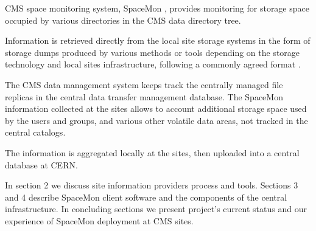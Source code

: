 CMS space monitoring system, SpaceMon \cite{spacemon}, provides monitoring for storage space 
occupied by various directories in the CMS data directory tree. 

Information is retrieved directly from the local site storage systems in the form of 
storage dumps produced by various methods or tools depending on the storage technology and
local sites infrastructure, following a commonly agreed format \cite{storagedumps}.

The CMS data management system \cite{cmsdatamanagement} keeps track the centrally managed 
file replicas in the central data transfer management database. The SpaceMon information 
collected at the sites allows to account additional storage space used by the users 
and groups, and various other volatile data areas, not tracked in the central catalogs.

The information is aggregated locally at the sites, then uploaded into a central database at CERN.

In section 2 we discuss site information providers process and tools. Sections 3 and 4 describe 
SpaceMon client software and the components of the central infrastructure.
In concluding sections we present project's current status and our experience of SpaceMon deployment 
at CMS sites.

